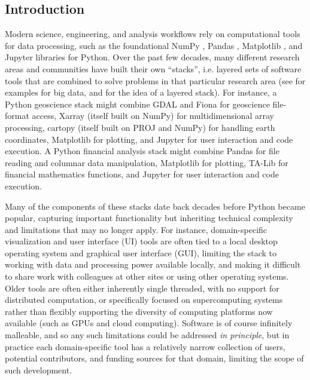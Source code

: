 \subsection{Introduction \label{introduction}}

Modern science, engineering, and analysis workflows rely on computational tools for data processing, such as the foundational NumPy \cite{harris:nature20}, Pandas \cite{mckinney:scipy10}, Matplotlib \cite{hunter:cse07}, and Jupyter \cite{kluyver:ppap16} libraries for Python. Over the past few decades, many different research areas and communities have built their own ``stacks'', i.e. layered sets of software tools that are combined to solve problems in that particular research area (see \cite{stancin:mipro19} for examples for big data, and \cite{briscoe:pcna00} for the idea of a layered stack). For instance, a Python geoscience stack might combine GDAL and Fiona for geoscience file-format access, Xarray \cite{hoyer:jors17} (itself built on NumPy) for multidimensional array processing, cartopy (itself built on PROJ and NumPy) for handling earth coordinates, Matplotlib for plotting, and Jupyter for user interaction and code execution. A Python financial analysis stack might combine Pandas for file reading and columnar data manipulation, Matplotlib for plotting, TA-Lib for financial mathematics functions, and Jupyter for user interaction and code execution.

Many of the components of these stacks date back decades before Python became popular, capturing important functionality but inheriting technical complexity and limitations that may no longer apply. For instance, domain-specific visualization and user interface (UI) tools are often tied to a local desktop operating system and graphical user interface (GUI), limiting the stack to working with data and processing power available locally, and making it difficult to share work with colleagues at other sites or using other operating systems. Older tools are often either inherently single threaded, with no support for distributed computation, or specifically focused on supercomputing systems rather than flexibly supporting the diversity of computing platforms now available (such as GPUs and cloud computing). Software is of course infinitely malleable, and so any such limitations could be addressed \emph{in principle}, but in practice each domain-specific tool has a relatively narrow collection of users, potential contributors, and funding sources for that domain, limiting the scope of such development.

